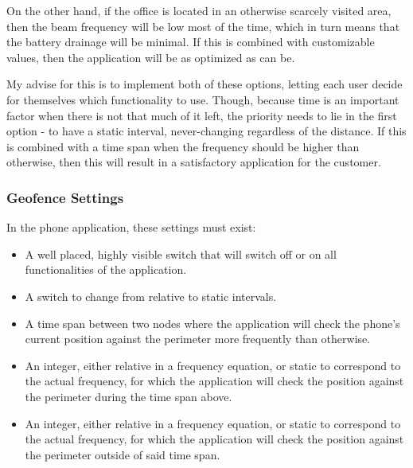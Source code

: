 On the other hand, if the office is located in an otherwise scarcely visited area, then the beam frequency will be low most of the time, which in turn means that the battery drainage will be minimal. If this is combined with customizable values, then the application will be as optimized as can be.

My advise for this is to implement both of these options, letting each user decide for themselves which functionality to use. Though, because time is an important factor when there is not that much of it left, the priority needs to lie in the first option - to have a static interval, never-changing regardless of the distance. If this is combined with a time span when the frequency should be higher than otherwise, then this will result in a satisfactory application for the customer.

\subsubsection{Geofence Settings}

In the phone application, these settings must exist:

\begin{itemize}
\item A well placed, highly visible switch that will switch off or on all functionalities of the application.
\item A switch to change from relative to static intervals.
\item A time span between two nodes where the application will check the phone's current position against the perimeter more frequently than otherwise.
\item An integer, either relative in a frequency equation, or static to correspond to the actual frequency, for which the application will check the position against the perimeter during the time span above.
\item An integer, either relative in a frequency equation, or static to correspond to the actual frequency, for which the application will check the position against the perimeter outside of said time span.
\end{itemize}
